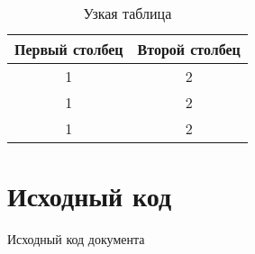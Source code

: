     \begin{longtable}{| c | c |}

      \caption{Узкая таблица} \label{table:narrow} \\

      \hline

      \textbf{Первый столбец} & \textbf{Второй столбец} \\ \hline

      1 & 2 \\ \hline

      1 & 2 \\ \hline

      1 & 2 \\ \hline

    \end{longtable}

  \section{Исходный код}

    \begin{source}

      \caption{Исходный код документа} \label{code:document}


    \end{source}


